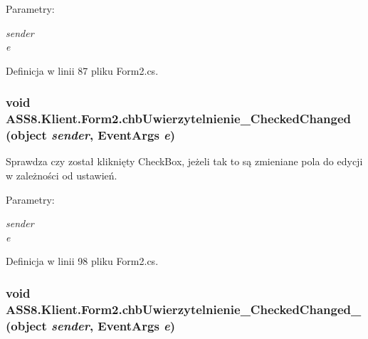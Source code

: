 \begin{Desc}
\item[Parametry:]
\begin{description}
\item[{\em sender}]\item[{\em e}]\end{description}
\end{Desc}


Definicja w linii 87 pliku Form2.cs.\hypertarget{a00004_c4c4b631a751d956ebda200dfd7ad1bc}{
\subsubsection[{chbUwierzytelnienie\_\-CheckedChanged}]{\setlength{\rightskip}{0pt plus 5cm}void ASS8.Klient.Form2.chbUwierzytelnienie\_\-CheckedChanged (object {\em sender}, \/  EventArgs {\em e})}}
\label{d0/d0b/a00004_c4c4b631a751d956ebda200dfd7ad1bc}


Sprawdza czy został kliknięty CheckBox, jeżeli tak to są zmieniane pola do edycji w zależności od ustawień. 

\begin{Desc}
\item[Parametry:]
\begin{description}
\item[{\em sender}]\item[{\em e}]\end{description}
\end{Desc}


Definicja w linii 98 pliku Form2.cs.\hypertarget{a00004_74d326c91a9c46b770f8cf028efb3507}{
\subsubsection[{chbUwierzytelnienie\_\-CheckedChanged\_\-1}]{\setlength{\rightskip}{0pt plus 5cm}void ASS8.Klient.Form2.chbUwierzytelnienie\_\-CheckedChanged\_ (object {\em sender}, \/  EventArgs {\em e})}}
\label{d0/d0b/a00004_74d326c91a9c46b770f8cf028efb3507}


